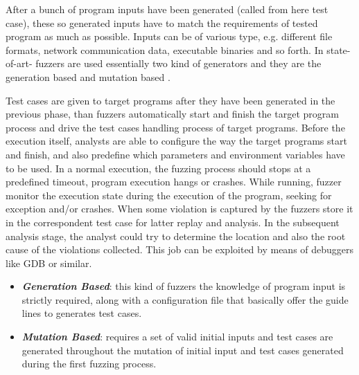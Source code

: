 After a bunch of program inputs have been generated (called from here test case), these so generated inputs have to match the requirements of tested program as much as possible. 
Inputs can be of various type, e.g. different file formats, network communication data, executable binaries and so forth.
In state-of-art- fuzzers are used essentially two kind of generators and they are the generation based and mutation based .

Test cases are given to target programs after they have been generated in the previous phase, than fuzzers automatically start and finish the target program process and drive the test cases handling process of target programs. 
Before the execution itself, analysts are able to configure the way the target programs start and finish, and also predefine which parameters and environment variables have to be used. 
In a normal execution, the fuzzing process should stops at a predefined timeout, program execution hangs or crashes. While running, fuzzer monitor the execution state during the execution of the program, seeking for exception and/or crashes.
When some violation is captured by the fuzzers store it in the correspondent test case for latter replay and analysis.
In the subsequent analysis stage, the analyst could try to determine the location and also the root cause of the violations collected. This job can be exploited by means of debuggers like GDB or similar.

\begin{itemize}
  \item \textbf{\textit{Generation Based}}: this kind of fuzzers the knowledge of program input is strictly required, along with a configuration file that basically offer the guide lines to generates test cases.
  \item \textbf{\textit{Mutation Based}}: requires a set of valid initial inputs and test cases are generated throughout the mutation of initial input and test cases generated during the first fuzzing process.
\end{itemize}

